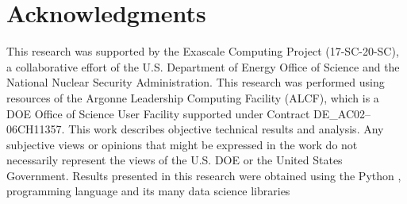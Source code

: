 \documentclass[a4paper,11pt]{article}
\begin{document}
\section{\label{sec:ack}Acknowledgments}
This research was supported by the Exascale Computing Project (17-SC-20-SC), a
collaborative effort of the U.S. Department of Energy Office of Science and the
National Nuclear Security Administration.
%
This research was performed using resources of the Argonne Leadership Computing
Facility (ALCF), which is a DOE Office of Science User Facility supported under
Contract DE\_AC02--06CH11357. 
%
This work describes objective technical results and analysis.
%
Any subjective views or opinions that might be expressed in the work do not
necessarily represent the views of the U.S. DOE or the United States
Government.
%
Results presented in this research were obtained using the Python
\citep{van1995python}, programming language and its many data science libraries
\cite{%
    matplotlib,
    harris2020array,
    ipython4160251%
}
%



\end{document}
